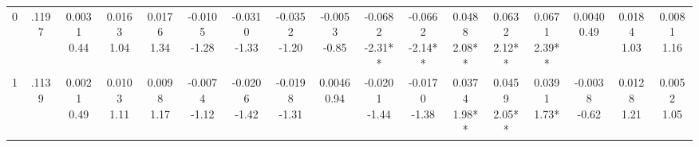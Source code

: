 \begin{landscape}
\begin{center}
{\begin{adjustbox}{max width=\textheight}
\begin{tabular}{lcccccccccccccccc}
0 & .1197 & \shortstack{0.0031\\0.44} & \shortstack{0.0163\\1.04} & \shortstack{0.0176\\1.34} & \shortstack{-0.0105\\-1.28} & \shortstack{-0.0310\\-1.33} & \shortstack{-0.0352\\-1.20} & \shortstack{-0.0053\\-0.85} & \shortstack{-0.0682\\-2.31**} & \shortstack{-0.0662\\-2.14**} & \shortstack{0.0488\\2.08**} & \shortstack{0.0632\\2.12**} & \shortstack{0.0671\\2.39**} & \shortstack{0.0040\\0.49} & \shortstack{0.0184\\1.03} & \shortstack{0.0081\\1.16} \\
1 & .1139 & \shortstack{0.0021\\0.49} & \shortstack{0.0103\\1.11} & \shortstack{0.0098\\1.17} & \shortstack{-0.0074\\-1.12} & \shortstack{-0.0206\\-1.42} & \shortstack{-0.0198\\-1.31} & \shortstack{0.0046\\0.94} & \shortstack{-0.0201\\-1.44} & \shortstack{-0.0170\\-1.38} & \shortstack{0.0374\\1.98**} & \shortstack{0.0459\\2.05**} & \shortstack{0.0391\\1.73*} & \shortstack{-0.0038\\-0.62} & \shortstack{0.0128\\1.21} & \shortstack{0.0052\\1.05} \\

\end{tabular}
\end{adjustbox}}
\end{center}
\end{landscape}
